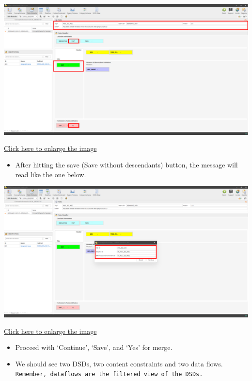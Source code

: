 \documentclass[
]{book}
\providecommand{\tightlist}{%
  \setlength{\itemsep}{0pt}\setlength{\parskip}{0pt}}
\begin{document}
\begin{center}\includegraphics[width=1\linewidth]{./images/image156} \end{center}

\href{images/image156.png}{Click here to enlarge the image}

\begin{itemize}
\tightlist
\item
  After hitting the save (Save without descendants) button, the message will read like the one below.
\end{itemize}

\begin{center}\includegraphics[width=1\linewidth]{./images/image158} \end{center}

\href{images/image158.png}{Click here to enlarge the image}

\begin{itemize}
\item
  Proceed with `Continue', `Save', and `Yes' for merge.
\item
  We should see two DSDs, two content constraints and two data flows. \texttt{Remember,\ dataflows\ are\ the\ filtered\ view\ of\ the\ DSDs.}
\end{itemize}
\end{document}
